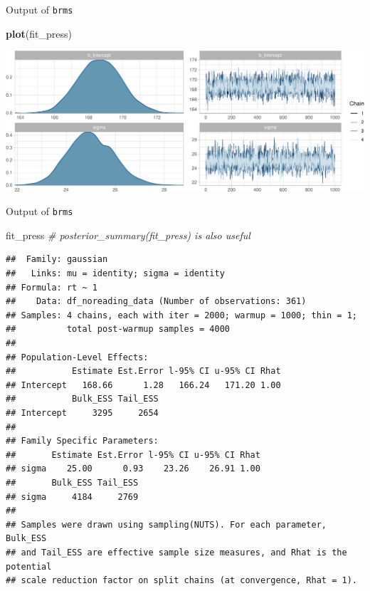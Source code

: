 \documentclass[12pt,ignorenonframetext,aspectratio=169]{beamer}
\newenvironment{Shaded}{\begin{snugshade}}{\end{snugshade}}
\newcommand{\CommentTok}[1]{\textcolor[rgb]{0.56,0.35,0.01}{\textit{#1}}}
\newcommand{\KeywordTok}[1]{\textcolor[rgb]{0.13,0.29,0.53}{\textbf{#1}}}
\newcommand{\NormalTok}[1]{#1}
\begin{document}
\begin{frame}[fragile]{Output of \texttt{brms}}
\protect\hypertarget{output-of-brms-1}{}

\small

\begin{Shaded}
\begin{Highlighting}[]
\KeywordTok{plot}\NormalTok{(fit_press)}
\end{Highlighting}
\end{Shaded}

\includegraphics{03-compbayes-slides_files/figure-beamer/unnamed-chunk-5-1.pdf}

\normalsize

\end{frame}

\begin{frame}[fragile]{Output of \texttt{brms}}
\protect\hypertarget{output-of-brms-2}{}

\scriptsize

\begin{Shaded}
\begin{Highlighting}[]
\NormalTok{fit_press}
\CommentTok{# posterior_summary(fit_press) is also useful}
\end{Highlighting}
\end{Shaded}

\begin{verbatim}
##  Family: gaussian 
##   Links: mu = identity; sigma = identity 
## Formula: rt ~ 1 
##    Data: df_noreading_data (Number of observations: 361) 
## Samples: 4 chains, each with iter = 2000; warmup = 1000; thin = 1;
##          total post-warmup samples = 4000
## 
## Population-Level Effects: 
##           Estimate Est.Error l-95% CI u-95% CI Rhat
## Intercept   168.66      1.28   166.24   171.20 1.00
##           Bulk_ESS Tail_ESS
## Intercept     3295     2654
## 
## Family Specific Parameters: 
##       Estimate Est.Error l-95% CI u-95% CI Rhat
## sigma    25.00      0.93    23.26    26.91 1.00
##       Bulk_ESS Tail_ESS
## sigma     4184     2769
## 
## Samples were drawn using sampling(NUTS). For each parameter, Bulk_ESS
## and Tail_ESS are effective sample size measures, and Rhat is the potential
## scale reduction factor on split chains (at convergence, Rhat = 1).
\end{verbatim}

\normalsize

\end{frame}
\end{document}
